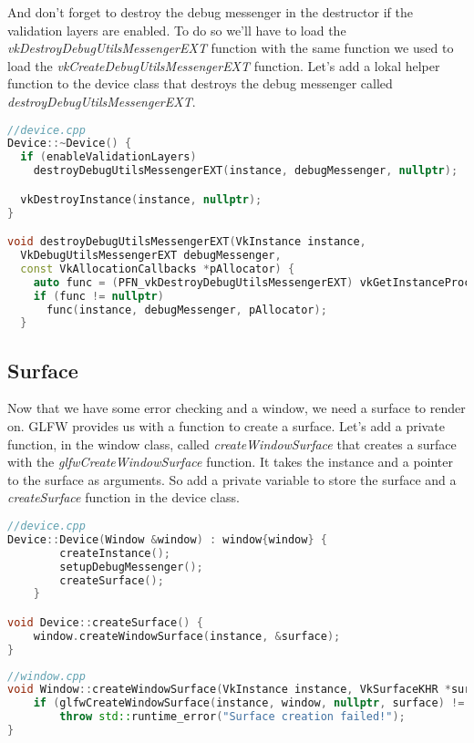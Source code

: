 \documentclass[12pt]{report} \usepackage{preamble}
\begin{document}
And don't forget to destroy the debug messenger in the destructor if the validation layers are enabled.
To do so we'll have to load the \textit{vkDestroyDebugUtilsMessengerEXT} function with the same
function we used to load the \textit{vkCreateDebugUtilsMessengerEXT} function. Let's add a lokal helper function
to the device class that destroys the debug messenger called \textit{destroyDebugUtilsMessengerEXT}.

\begin{lstlisting}[language=C++]
//device.cpp
Device::~Device() {
  if (enableValidationLayers)
    destroyDebugUtilsMessengerEXT(instance, debugMessenger, nullptr);

  vkDestroyInstance(instance, nullptr);
}

void destroyDebugUtilsMessengerEXT(VkInstance instance, 
  VkDebugUtilsMessengerEXT debugMessenger, 
  const VkAllocationCallbacks *pAllocator) {
    auto func = (PFN_vkDestroyDebugUtilsMessengerEXT) vkGetInstanceProcAddr(instance, "vkDestroyDebugUtilsMessengerEXT");
    if (func != nullptr) 
      func(instance, debugMessenger, pAllocator);
  }
\end{lstlisting}

\subsection{Surface}

Now that we have some error checking and a window, we need a surface to render on.
GLFW provides us with a function to create a surface. Let's add a private function,
in the window class, called
\textit{createWindowSurface} that creates a surface with the \textit{glfwCreateWindowSurface} function.
It takes the instance and a pointer to the surface as arguments. So add a private variable
to store the surface and a \textit{createSurface} function in the device class.

\begin{lstlisting}[language=C++]
//device.cpp
Device::Device(Window &window) : window{window} {
		createInstance();
		setupDebugMessenger();
		createSurface();
	}

void Device::createSurface() {
	window.createWindowSurface(instance, &surface);
}
\end{lstlisting}

\begin{lstlisting}[language=C++]
//window.cpp
void Window::createWindowSurface(VkInstance instance, VkSurfaceKHR *surface) {
	if (glfwCreateWindowSurface(instance, window, nullptr, surface) != VK_SUCCESS)
		throw std::runtime_error("Surface creation failed!");
}
\end{lstlisting}
\end{document}
